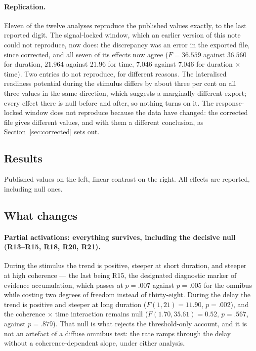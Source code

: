 \documentclass[a4paper,11pt]{article}
\newcommand{\NN}[1]{\textcolor{newcol}{#1}}
\newcommand{\1}{\mathbbm{1}}
\begin{document}
\paragraph{Replication.} Eleven of the twelve analyses reproduce the published
values exactly, to the last reported digit. \NN{The signal-locked window, which an
earlier version of this note could not reproduce, now does: the discrepancy was an
error in the exported file, since corrected, and all seven of its effects now agree
($F=36.559$ against $36.560$ for duration, $21.964$ against $21.96$ for time,
$7.046$ against $7.046$ for duration $\times$ time).} Two entries do not reproduce, for
different reasons. The lateralised readiness potential during the stimulus differs by
about three per cent on all three values in the same direction, which suggests a
marginally different export; every effect there is null before and after, so nothing
turns on it. \NN{The response-locked window does not reproduce because the data have changed:
the corrected file gives different values, and with them a different conclusion, as
Section~\ref{sec:corrected} sets out.}

\subsection{Results}
\label{sec:reanalysis-tables}

Published values on the left, linear contrast on the right. All effects are reported,
including null ones.



\subsection{What changes}

\paragraph{Partial activations: everything survives, including the decisive null
(R13--R15, R18, R20, R21).}
During the stimulus the trend is positive, steeper at short duration, and steeper at
high coherence --- the last being R15, the designated diagnostic marker of evidence
accumulation, which passes at $p=.007$ against $p=.005$ for the omnibus while costing
two degrees of freedom instead of thirty-eight. During the delay the trend is positive
and steeper at long duration ($F(1,21)=11.90$, $p=.002$), and the coherence $\times$
time interaction remains null ($F(1.70,35.61)=0.52$, $p=.567$, against $p=.879$). That null is what rejects the threshold-only account, and
it is not an artefact of a diffuse omnibus test: the rate ramps through the delay
without a coherence-dependent slope, under either analysis.
\end{document}
